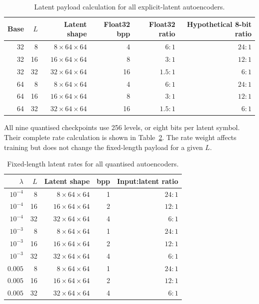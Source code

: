\documentclass[10pt,a4paper]{article}
\begin{document}
\begin{table}[ht]
\centering
\small
\caption{Latent payload calculation for all explicit-latent autoencoders.}
\begin{tabular}{rrrrrr}
\toprule
Base & \(L\) & Latent shape & Float32 bpp & Float32 ratio &
Hypothetical 8-bit ratio \\
\midrule
32 & 8  & \(8\times64\times64\)  & 4  & \(6{:}1\)   & \(24{:}1\) \\
32 & 16 & \(16\times64\times64\) & 8  & \(3{:}1\)   & \(12{:}1\) \\
32 & 32 & \(32\times64\times64\) & 16 & \(1.5{:}1\) & \(6{:}1\) \\
64 & 8  & \(8\times64\times64\)  & 4  & \(6{:}1\)   & \(24{:}1\) \\
64 & 16 & \(16\times64\times64\) & 8  & \(3{:}1\)   & \(12{:}1\) \\
64 & 32 & \(32\times64\times64\) & 16 & \(1.5{:}1\) & \(6{:}1\) \\
\bottomrule
\end{tabular}
\label{tab:latent-rates}
\end{table}

All nine quantised checkpoints use 256 levels, or eight bits per latent
symbol. Their complete rate calculation is shown in
Table~\ref{tab:quantised-rates}. The rate weight affects training but does not
change the fixed-length payload for a given \(L\).

\begin{table}[ht]
\centering
\small
\caption{Fixed-length latent rates for all quantised autoencoders.}
\begin{tabular}{rrrrr}
\toprule
\(\lambda\) & \(L\) & Latent shape & bpp & Input:latent ratio \\
\midrule
\(10^{-4}\) & 8  & \(8\times64\times64\)  & 1 & \(24{:}1\) \\
\(10^{-4}\) & 16 & \(16\times64\times64\) & 2 & \(12{:}1\) \\
\(10^{-4}\) & 32 & \(32\times64\times64\) & 4 & \(6{:}1\) \\
\(10^{-3}\) & 8  & \(8\times64\times64\)  & 1 & \(24{:}1\) \\
\(10^{-3}\) & 16 & \(16\times64\times64\) & 2 & \(12{:}1\) \\
\(10^{-3}\) & 32 & \(32\times64\times64\) & 4 & \(6{:}1\) \\
\(0.005\)   & 8  & \(8\times64\times64\)  & 1 & \(24{:}1\) \\
\(0.005\)   & 16 & \(16\times64\times64\) & 2 & \(12{:}1\) \\
\(0.005\)   & 32 & \(32\times64\times64\) & 4 & \(6{:}1\) \\
\bottomrule
\end{tabular}
\label{tab:quantised-rates}
\end{table}
\end{document}
